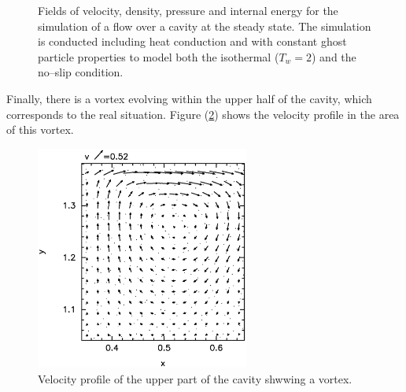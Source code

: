 \documentclass[11pt,a4paper,twoside]{report}
\begin{document}
\begin{figure}[!htbp]

\centering
\label{fig:Cavities_steadyState}

\caption[Property fields for Cavity]{Fields of velocity, density, pressure and internal energy for the simulation of a flow over a cavity at the steady state. The simulation is conducted including heat conduction and with constant ghost particle properties to model both the isothermal ($T_w=2$) and the no--slip condition.}

\end{figure}


Finally, there is a vortex evolving within the upper half of the cavity, which corresponds to the real situation. Figure (\ref{fig:Cavity_vortex}) shows the velocity profile in the area of this vortex.


\begin{figure}
 \centering
\label{fig:Cavity_vortex}
\includegraphics[width=7cm]{Graphics/results/Porosities/Cavity/supLen_dx_4_dx0_2_SumDens_g0_2/vortex25}
\caption[Vortex in Cavity]{Velocity profile of the upper part of the cavity shwwing a vortex.}
\end{figure}
\end{document}
